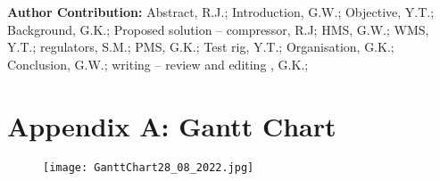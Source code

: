 \documentclass[a4paper,11pt]{article}
\begin{document}
\textbf{Author Contribution: }Abstract, R.J.; Introduction, G.W.; Objective, Y.T.; Background, G.K.; Proposed solution – compressor, R.J; HMS, G.W.; WMS, Y.T.; regulators, S.M.; PMS, G.K.; Test rig, Y.T.; Organisation, G.K.; Conclusion, G.W.; writing – review and editing , G.K.; 

\newpage







\newpage
\appendix
\appendixpage
\section{Appendix A: Gantt Chart}\label{section:gantt}

\begin{figure}[h]\label{fig:ganttChart} 
    \texttt{[image: GanttChart28\_08\_2022.jpg]}
    \centering
\end{figure}
\end{document}
